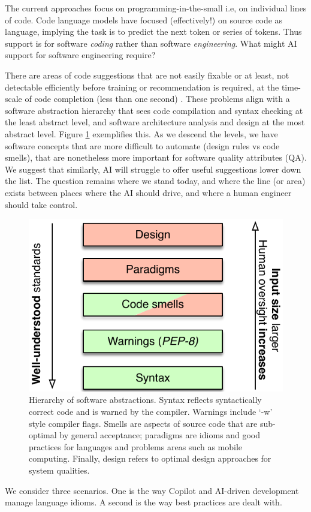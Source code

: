 \label{chapter:Exp}

The current approaches focus on programming-in-the-small i.e, on individual lines of code. 
Code language models have focused (effectively!) on source code as language, implying the task is to predict the next token or series of tokens.
Thus support is for software \textit{coding} rather than software \emph{engineering}. 
What might AI support for software engineering require? 

There are areas of code suggestions that are not easily fixable or at least, not detectable efficiently before training or recommendation is required, at the time-scale of code completion (less than one second) \cite{}.
These problems align with a software abstraction hierarchy that sees code compilation and syntax checking at the least abstract level, and software architecture analysis and design at the most abstract level.
Figure \ref{fig:levels} exemplifies this. 
As we descend the levels, we have software concepts that are more difficult to automate (design rules vs code smells), that are nonetheless more important for software quality attributes (QA). 
We suggest that similarly, AI will struggle to offer useful suggestions lower down the list. 
The question remains where we stand today, and where the line (or area) exists between places where the AI should drive, and where a human engineer should take control.

\begin{figure}
    \centering
    \includegraphics[width=.5\linewidth]{Figures/taxonomy-copilot.pdf}
    \caption{Hierarchy of software abstractions. Syntax reflects syntactically correct code and is warned by the compiler. Warnings include `-w' style compiler flags. Smells are aspects of source code that are sub-optimal by general acceptance; paradigms are idioms and good practices for languages and problems areas such as mobile computing. Finally, design refers to optimal design approaches for system qualities.}
    \label{fig:levels}
\end{figure}

We consider three scenarios. 
One is the way Copilot and AI-driven development manage language idioms.
A second is the way best practices are dealt with.




